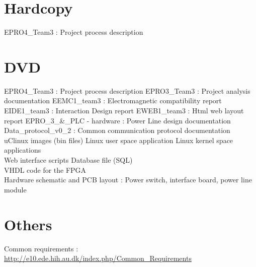 \section{Hardcopy}
EPRO4\_Team3 : Project process description
\section{DVD}
EPRO4\_Team3 : Project process description
\p EPRO3\_Team3 : Project analysis documentation
\p EEMC1\_team3 : Electromagnetic compatibility report
\p EIDE1\_team3 : Interaction Design report
\p EWEB1\_team3 : Html web layout report
\p EPRO\_3\_\&\_PLC - hardware : Power Line design documentation
\p Data\_protocol\_v0\_2 : Common communication protocol documentation
\\\p uClinux images (bin files)
\p Linux user space application
\p Linux kernel space applications
\\\p Web interface scripts
\p Database file (SQL)
\\\p VHDL code for the FPGA
\\\p Hardware schematic and PCB layout : Power switch, interface board, power line module
\section{Others}
Common requirements : \url{http://e10.ede.hih.au.dk/index.php/Common_Requirements}